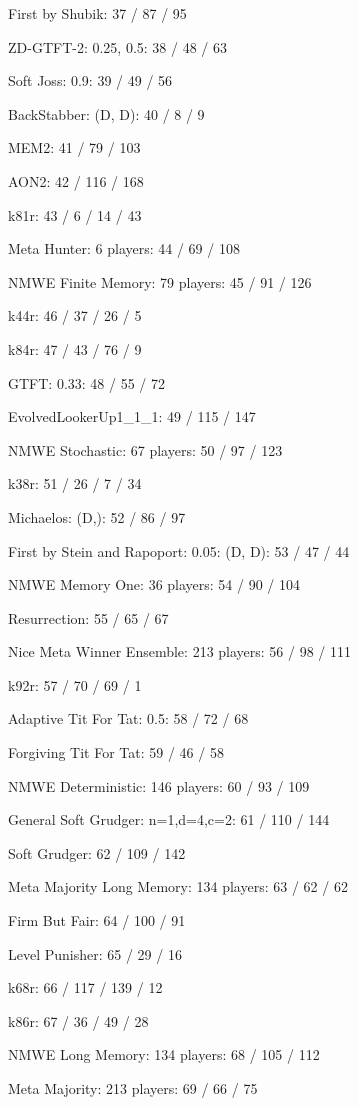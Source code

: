 \item First by Shubik: 37 / 87 / 95
\item ZD-GTFT-2: 0.25, 0.5: 38 / 48 / 63
\item Soft Joss: 0.9: 39 / 49 / 56
\item BackStabber: (D, D): 40 / 8 / 9
\item MEM2: 41 / 79 / 103
\item AON2: 42 / 116 / 168
\item k81r: 43 / 6 / 14 / 43
\item Meta Hunter: 6 players: 44 / 69 / 108
\item NMWE Finite Memory: 79 players: 45 / 91 / 126
\item k44r: 46 / 37 / 26 / 5
\item k84r: 47 / 43 / 76 / 9
\item GTFT: 0.33: 48 / 55 / 72
\item EvolvedLookerUp1_1_1: 49 / 115 / 147
\item NMWE Stochastic: 67 players: 50 / 97 / 123
\item k38r: 51 / 26 / 7 / 34
\item Michaelos: (D,): 52 / 86 / 97
\item First by Stein and Rapoport: 0.05: (D, D): 53 / 47 / 44
\item NMWE Memory One: 36 players: 54 / 90 / 104
\item Resurrection: 55 / 65 / 67
\item Nice Meta Winner Ensemble: 213 players: 56 / 98 / 111
\item k92r: 57 / 70 / 69 / 1
\item Adaptive Tit For Tat: 0.5: 58 / 72 / 68
\item Forgiving Tit For Tat: 59 / 46 / 58
\item NMWE Deterministic: 146 players: 60 / 93 / 109
\item General Soft Grudger: n=1,d=4,c=2: 61 / 110 / 144
\item Soft Grudger: 62 / 109 / 142
\item Meta Majority Long Memory: 134 players: 63 / 62 / 62
\item Firm But Fair: 64 / 100 / 91
\item Level Punisher: 65 / 29 / 16
\item k68r: 66 / 117 / 139 / 12
\item k86r: 67 / 36 / 49 / 28
\item NMWE Long Memory: 134 players: 68 / 105 / 112
\item Meta Majority: 213 players: 69 / 66 / 75
